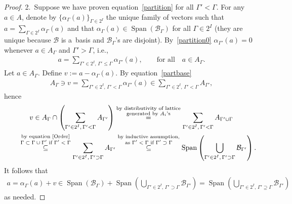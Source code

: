 \documentclass[pdftex]{sigma}
\DeclareMathOperator{\Span}{Span}
\begin{document}
\begin{proof}
2.~Suppose we have proven equation~\eqref{partition} for all $\Gamma'<\Gamma$.
For any $a\in A$, denote by $\{\alpha_\Gamma(a)\}_{\Gamma\in 2^I}$ the unique family of vectors such that
$a=\sum\limits_{\Gamma\in2^I}\alpha_\Gamma(a)$ and that $\alpha_\Gamma(a)\in \Span(\mathcal{B}_\Gamma)$ for all
$\Gamma\in2^I$ (they are unique because $\mathcal{B}$ is a~basis and $\mathcal{B}_\Gamma$'s are disjoint).
By~\eqref{partition0} $\alpha_{\Gamma'}(a)=0$ whenever $a\in A_\Gamma$ and $\Gamma'>\Gamma$, i.e.,
\begin{gather}
\label{partbase}
a=\sum\limits_{\Gamma'\in2^I,\, \Gamma'\leq\Gamma}\alpha_{\Gamma'}(a),
\qquad
\text{for all}
\quad
a\in A_\Gamma.
\end{gather}
Let $a\in A_\Gamma$.
Def\/ine $v:=a-\alpha_\Gamma(a)$.
By equation~\eqref{partbase}
\begin{gather*}
A_\Gamma\ni v = \sum\limits_{\Gamma'\in 2^I,
\,
\Gamma'<\Gamma}\alpha_{\Gamma'}(a)\in\sum\limits_{\Gamma'\in 2^I,
\,
\Gamma'<\Gamma}A_{\Gamma'},
\end{gather*}
hence
\begin{gather*}
v \in A_\Gamma\cap\left(\sum\limits_{\Gamma'\in 2^I,
\,
\Gamma'<\Gamma}A_{\Gamma'}\right)
\overset{\substack{\text{by distributivity of lattice}\\ \text{generated by $A_i$'s}}}{=}
\sum\limits_{\Gamma'\in 2^I,
\,
\Gamma'<\Gamma}A_{\Gamma'\cup\Gamma}
\\
\qquad \overset{\substack{\text{by equation~\eqref{Order}} \\ \text{$\Gamma\subset\Gamma\cup\Gamma'$ if $\Gamma'<\Gamma$}}}{\subseteq}
\sum\limits_{\Gamma'\in 2^I,
\,
\Gamma'\supset\Gamma}A_{\Gamma'}
 \overset{\substack{\text{by inductive assumption,} \\ \text{as $\Gamma'<\Gamma$ if $\Gamma'\supset\Gamma$}}}{\subseteq}
\Span\left(\bigcup_{\Gamma'\in 2^I,
\,
\Gamma'\supset\Gamma}\mathcal{B}_{\Gamma'} \right).
\end{gather*}
It follows that
\begin{gather*}
a= \alpha_\Gamma(a)+v\in\Span(\mathcal{B}_\Gamma)+\Span\left(\bigcup_{\Gamma'\in 2^I,
\,
\Gamma'\supset\Gamma}\mathcal{B}_{\Gamma'} \right) = \Span\left(\bigcup_{\Gamma'\in 2^I,
\,
\Gamma'\supseteq\Gamma}\mathcal{B}_{\Gamma'} \right)
\end{gather*}
as needed.
\end{proof}
\end{document}
